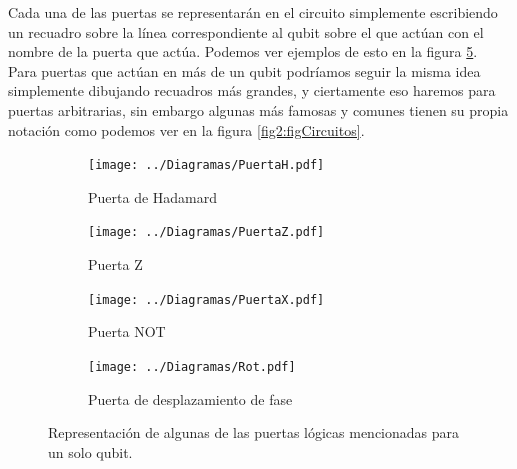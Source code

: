 \documentclass[11pt, spanish]{report}
\numberwithin{equation}{section}
\numberwithin{defin}{section}
\begin{document}
Cada una de las puertas se representarán en el circuito simplemente escribiendo un recuadro sobre la línea correspondiente al qubit sobre el que actúan con el nombre de la puerta que actúa. Podemos ver ejemplos de esto en la figura \ref{fig:figCircuitos}.\\


Para puertas que actúan en más de un qubit podríamos seguir la misma idea simplemente dibujando recuadros más grandes, y ciertamente eso haremos para puertas arbitrarias, sin embargo algunas más famosas y comunes tienen su propia notación como podemos ver en la figura \ref{fig2:figCircuitos}.\\

\begin{figure}
\begin{subfigure}{.25\textwidth}
  \centering
  \texttt{[image: ../Diagramas/PuertaH.pdf]}
  \caption{Puerta de Hadamard}
  \label{fig:sfig1}
\end{subfigure}%
\begin{subfigure}{.25\textwidth}
  \centering
  \texttt{[image: ../Diagramas/PuertaZ.pdf]}
  \caption{Puerta Z}
  \label{fig:sfig2}
\end{subfigure}%
\begin{subfigure}{.25\textwidth}
  \centering
  \texttt{[image: ../Diagramas/PuertaX.pdf]}
  \caption{Puerta NOT}
  \label{fig:sfig3}
\end{subfigure}%
\begin{subfigure}{.25\textwidth}
  \centering
  \texttt{[image: ../Diagramas/Rot.pdf]}
  \caption{Puerta de desplazamiento de fase}
  \label{fig:sfig4}
\end{subfigure}
\caption{Representación de algunas de las puertas lógicas mencionadas para un solo qubit.}
\label{fig:figCircuitos}
\end{figure}
\end{document}
